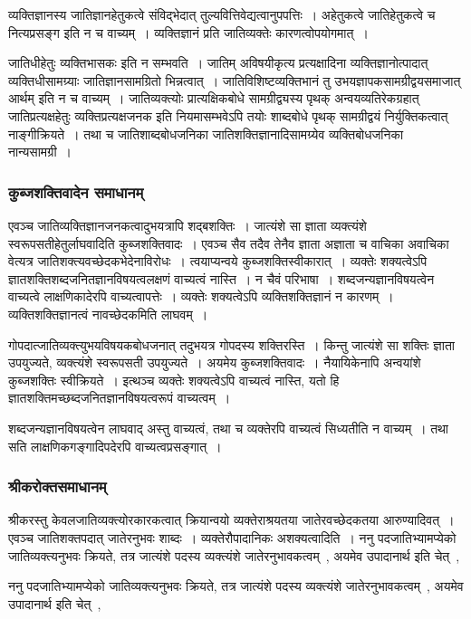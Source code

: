				व्यक्तिज्ञानस्य जातिज्ञानहेतुकत्वे संविद्भेदात् तुल्यवित्तिवेद्यत्वानुपपत्तिः~। अहेतुकत्वे जातिहेतुकत्वे च नित्यप्रसङ्ग इति न च वाच्यम्~। व्यक्तिज्ञानं प्रति जातिव्यक्तेः कारणत्वोपयोगमात्~।

				जातिधीहेतुः व्यक्तिभासकः इति न सम्भवति~। जातिम् अविषयीकृत्य प्रत्यक्षादिना व्यक्तिज्ञानोत्पादात् व्यक्तिधीसामग्र्याः जातिज्ञानसामग्रितो भिन्नत्वात्~। जातिविशिष्टव्यक्तिभानं तु उभयज्ञापकसामग्रीद्वयसमाजात् आर्थम् इति न च वाच्यम्~। जातिव्यक्त्योः  प्रात्यक्षिकबोधे सामग्रीद्व्यस्य पृथक् अन्वयव्यतिरेकग्रहात् जातिप्रत्यक्षहेतुः व्यक्तिप्रत्यक्षजनक इति नियमासम्भवेऽपि तयोः शाब्दबोधे पृथक् सामग्रीद्वयं निर्युक्तिकत्वात् नाङ्गीक्रियते~। तथा च जातिशाब्दबोधजनिका जातिशक्तिज्ञानादिसामग्र्येव व्यक्तिबोधजनिका नान्यसामग्री~।

			\subsubsection{कुब्जशक्तिवादेन समाधानम्}
				\begin{small}
					एवञ्च  जातिव्यक्तिज्ञानजनकत्वादुभयत्रापि शद्बशक्तिः~। जात्यंशे सा ज्ञाता व्यक्त्यंशे स्वरूपसतीहेतुर्लाघवादिति कुब्जशक्तिवादः~। एवञ्च सैव तदैव तेनैव ज्ञाता अज्ञाता च वाचिका अवाचिका वेत्यत्र जातिशक्त्यवच्छेदकभेदेनाविरोधः~। त्वयाप्यन्वये कुब्जशक्तिस्वीकारात्~। व्यक्तेः शक्यत्वेऽपि ज्ञातशक्तिशब्दजनितज्ञानविषयत्वलक्षणं वाच्यत्वं नास्ति~। न चैवं परिभाषा~। शब्दजन्यज्ञानविषयत्वेन वाच्यत्वे लाक्षणिकादेरपि वाच्यत्वापत्तेः~। व्यक्तेः शक्यत्वेऽपि व्यक्तिशक्तिज्ञानं न कारणम्~। व्यक्तिशक्तिज्ञानत्वं नावच्छेदकमिति लाघवम्~।
				\end{small}

				गोपदात्जातिव्यक्त्युभयविषयकबोधजनात् तदुभयत्र गोपदस्य शक्तिरस्ति~। किन्तु जात्यंशे सा शक्तिः ज्ञाता उपयुज्यते, व्यक्त्यंशे स्वरूपसती उपयुज्यते~। अयमेय कुब्जशक्तिवादः~। नैयायिकेनापि अन्वयांशे कुब्जशक्तिः स्वीक्रियते~। इत्थञ्च व्यक्तेः शक्यत्वेऽपि वाच्यत्वं नास्ति, यतो हि ज्ञातशक्तिमच्छब्दजनितज्ञानविषयत्वरूपं वाच्यत्वम्~।

				शब्दजन्यज्ञानविषयत्वेन लाघवाद् अस्तु वाच्यत्वं, तथा च व्यक्तेरपि वाच्यत्वं       सिध्यतीति न वाच्यम्~। तथा सति लाक्षणिकगङ्गादिपदेरपि वाच्यत्वप्रसङ्गात्~। 

			\subsubsection{श्रीकरोक्तसमाधानम्}
				\begin{small}
					श्रीकरस्तु केवलजातिव्यक्त्योरकारकत्वात् क्रियान्वयो व्यक्तेराश्रयतया जातेरवच्छेदकतया आरुण्यादिवत्~। एवञ्च जातिशक्तपदात् जातेरनुभवः शाब्दः~। व्यक्तेरौपादानिकः अशक्यत्वादिति~। ननु पदजातिभ्यामप्येको जातिव्यक्त्यनुभवः क्रियते, तत्र जात्यंशे पदस्य व्यक्त्यंशे जातेरनुभावकत्वम्~, अयमेव उपादानार्थ इति चेत्~, 

					ननु पदजातिभ्यामप्येको जातिव्यक्त्यनुभवः क्रियते, तत्र जात्यंशे पदस्य व्यक्त्यंशे जातेरनुभावकत्वम्~, अयमेव उपादानार्थ इति चेत्~, 
				\end{small}

